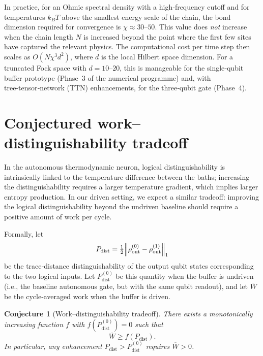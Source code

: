 \documentclass[11pt,a4paper]{article}
\theoremstyle{plain}
\newtheorem{conjecture}{Conjecture}[section]
\theoremstyle{definition}
\theoremstyle{remark}
\begin{document}
In practice, for an Ohmic spectral density with a high‑frequency cutoff and for temperatures $k_B T$ above the smallest energy scale of the chain, the bond dimension required for convergence is $\chi \approx 30$–$50$. This value does \emph{not} increase when the chain length $N$ is increased beyond the point where the first few sites have captured the relevant physics. The computational cost per time step then scales as $O(N\chi^3 d^2)$, where $d$ is the local Hilbert space dimension. For a truncated Fock space with $d=10$–$20$, this is manageable for the single‑qubit buffer prototype (Phase~3 of the numerical programme) and, with tree‑tensor‑network (TTN) enhancements, for the three‑qubit gate (Phase~4).

\section{Conjectured work–distinguishability tradeoff}\label{sec:conjecture}
In the autonomous thermodynamic neuron, logical distinguishability is intrinsically linked to the temperature difference between the baths; increasing the distinguishability requires a larger temperature gradient, which implies larger entropy production. In our driven setting, we expect a similar tradeoff: improving the logical distinguishability beyond the undriven baseline should require a positive amount of work per cycle.

Formally, let
\begin{equation}
P_{\text{dist}} = \tfrac12 \norm{ \rho_{\text{out}}^{(0)} - \rho_{\text{out}}^{(1)} }_1
\end{equation}
be the trace‑distance distinguishability of the output qubit states corresponding to the two logical inputs. Let $P_{\text{dist}}^{(0)}$ be this quantity when the buffer is undriven (i.e., the baseline autonomous gate, but with the same qubit readout), and let $\overline{W}$ be the cycle‑averaged work when the buffer is driven.

\begin{conjecture}[Work–distinguishability tradeoff]\label{conj:tradeoff}
There exists a monotonically increasing function $f$ with $f(P_{\text{dist}}^{(0)})=0$ such that
\begin{equation}
\overline{W} \ge f(P_{\text{dist}}).
\end{equation}
In particular, any enhancement $P_{\text{dist}} > P_{\text{dist}}^{(0)}$ requires $\overline{W}>0$.
\end{conjecture}
\end{document}
